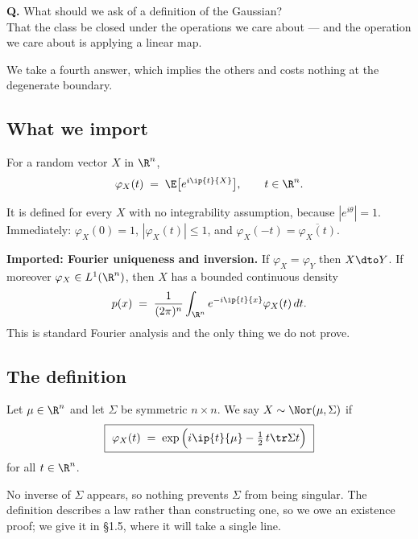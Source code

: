 \documentclass[11pt]{article}
\begin{document}
\begin{question}
\textbf{Q.} What should we ask of a definition of the Gaussian?\\[0.25em]
That the class be closed under the operations we care about --- and the operation we care about is applying a linear map.
\end{question}

We take a fourth answer, which implies the others and costs nothing at the degenerate boundary.

\subsection{What we import}

\begin{definition}
For a random vector $X$ in $\R^n$,
\[
\varphi_X(t)\;=\;\E\big[e^{i\ip{t}{X}}\big],\qquad t\in\R^n .
\]
\end{definition}

It is defined for every $X$ with no integrability assumption, because $|e^{i\theta}|=1$. Immediately: $\varphi_X(0)=1$, $|\varphi_X(t)|\le 1$, and $\varphi_X(-t)=\overline{\varphi_X(t)}$.

\begin{imported}
\textbf{Imported: Fourier uniqueness and inversion.} If $\varphi_X=\varphi_Y$ then $X\dto Y$. If moreover $\varphi_X\in L^1(\R^n)$, then $X$ has a bounded continuous density
\[
p(x)\;=\;\frac{1}{(2\pi)^n}\int_{\R^n} e^{-i\ip{t}{x}}\varphi_X(t)\,dt .
\]
This is standard Fourier analysis and the only thing we do not prove.
\end{imported}

\subsection{The definition}

\begin{definition}\label{def:gauss}
Let $\mu\in\R^n$ and let $\Sigma$ be symmetric $n\times n$. We say $X\sim\Nor(\mu,\Sigma)$ if
\[
\boxed{\ \varphi_X(t)\;=\;\exp\Big(i\ip{t}{\mu}-\tfrac12\,t\tr\Sigma t\Big)\ }
\]
for all $t\in\R^n$.
\end{definition}

No inverse of $\Sigma$ appears, so nothing prevents $\Sigma$ from being singular. The definition describes a law rather than constructing one, so we owe an existence proof; we give it in \S1.5, where it will take a single line.
\end{document}
